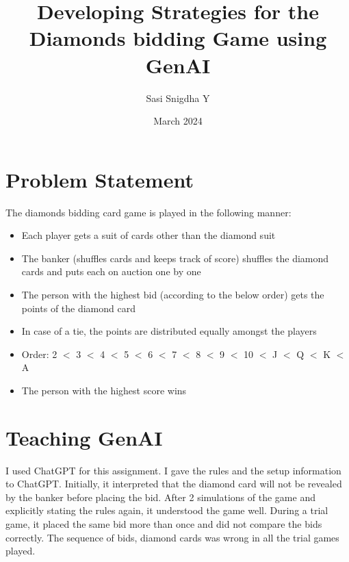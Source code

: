 \documentclass{article}
\title{Developing Strategies for the Diamonds bidding Game using GenAI}
\author{Sasi Snigdha Y}
\date{March 2024}
\begin{document}
\maketitle

\section{Problem Statement}
\begin{text}
\begin{large}
The diamonds bidding card game is played in the following manner:
\begin{itemize}
\item Each player gets a suit of cards other than the diamond suit
\item The banker (shuffles cards and keeps track of score) shuffles the diamond cards and puts each on auction one by one
\item The person with the highest bid (according to the below order) gets the points of the diamond card
\item In case of a tie, the points are distributed equally amongst the players
\item Order: 2 $<$ 3 $<$ 4 $<$ 5 $<$ 6 $<$ 7 $<$ 8 $<$ 9 $<$ 10 $<$ J $<$ Q $<$ K $<$ A
\item The person with the highest score wins
\end{itemize}
\end{large}
\end{text}
\vspace{12pt}

\section{Teaching GenAI}
\begin{text}
\begin{large}
I used ChatGPT for this assignment. I gave the rules and the setup information to ChatGPT. Initially, it interpreted that the diamond card will not be revealed by the banker before placing the bid. After 2 simulations of the game and explicitly stating the rules again, it understood the game well. During a trial game, it placed the same bid more than once and did not compare the bids correctly. The sequence of bids, diamond cards was wrong in all the trial games played. 
\end{large}
\end{text}

\vspace{12pt}
\end{document}

